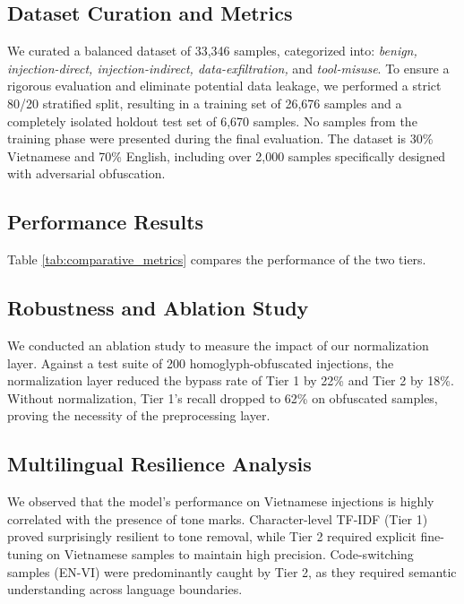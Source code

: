 \documentclass[10pt,conference]{IEEEtran}
\begin{document}
\subsection{Dataset Curation and Metrics}
We curated a balanced dataset of 33,346 samples, categorized into: \textit{benign, injection-direct, injection-indirect, data-exfiltration,} and \textit{tool-misuse}. To ensure a rigorous evaluation and eliminate potential data leakage, we performed a strict 80/20 stratified split, resulting in a training set of 26,676 samples and a completely isolated holdout test set of 6,670 samples. No samples from the training phase were presented during the final evaluation. The dataset is 30\% Vietnamese and 70\% English, including over 2,000 samples specifically designed with adversarial obfuscation.

\subsection{Performance Results}
Table \ref{tab:comparative_metrics} compares the performance of the two tiers.

\begin{table}[H]

\end{table}

\subsection{Robustness and Ablation Study}
We conducted an ablation study to measure the impact of our normalization layer. Against a test suite of 200 homoglyph-obfuscated injections, the normalization layer reduced the bypass rate of Tier 1 by 22\% and Tier 2 by 18\%. Without normalization, Tier 1's recall dropped to 62\% on obfuscated samples, proving the necessity of the preprocessing layer.

\subsection{Multilingual Resilience Analysis}
We observed that the model's performance on Vietnamese injections is highly correlated with the presence of tone marks. Character-level TF-IDF (Tier 1) proved surprisingly resilient to tone removal, while Tier 2 required explicit fine-tuning on Vietnamese samples to maintain high precision. Code-switching samples (EN-VI) were predominantly caught by Tier 2, as they required semantic understanding across language boundaries.
\end{document}
